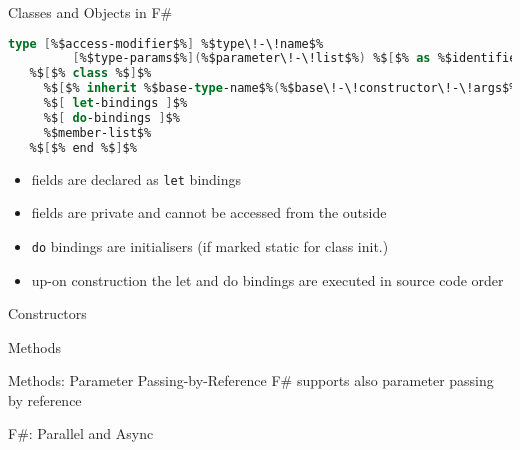 \documentclass{beamer}
\begin{document}
\begin{frame}[fragile]{Classes and Objects in F\#}

\begin{lstlisting}[language=FSharp, escapechar=\%]
type [%$access-modifier$%] %$type\!-\!name$% 
         [%$type-params$%](%$parameter\!-\!list$%) %$[$% as %$identifier]$% =
   %$[$% class %$]$%
     %$[$% inherit %$base-type-name$%(%$base\!-\!constructor\!-\!args$%) %]%
     %$[ let-bindings ]$%
     %$[ do-bindings ]$%
     %$member-list$%
   %$[$% end %$]$%
\end{lstlisting}

\begin{itemize}
  \item fields are declared as \texttt{let} bindings
  \item fields are private and cannot be accessed from the outside
  \item \lstinline!do! bindings are initialisers (if marked static for class init.)
  \item up-on construction the let and do bindings are executed in source code order
\end{itemize}


\end{frame}

\begin{frame}{Constructors}
  
\end{frame}

\begin{frame}{Methods}
\end{frame}

\begin{frame}{Methods: Parameter Passing-by-Reference}
F\# supports also parameter passing by reference
\end{frame}

\begin{frame}{F\#: Parallel and Async}
\end{frame}
\end{document}
